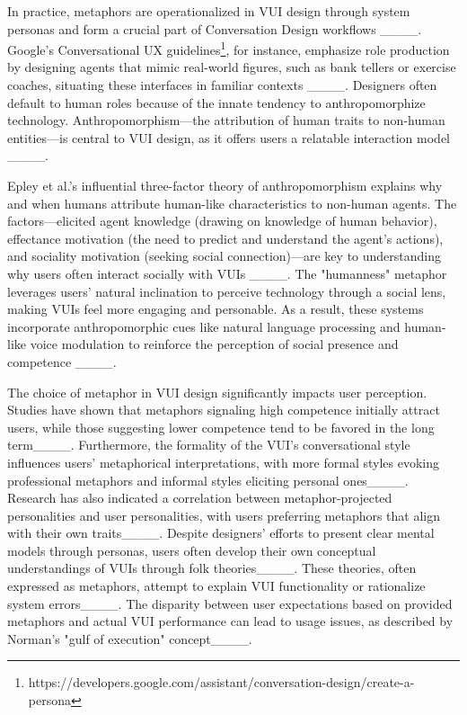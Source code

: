 In practice, metaphors are operationalized in VUI design through system personas and form a crucial part of Conversation Design workflows ____. Google's Conversational UX guidelines\footnote{https://developers.google.com/assistant/conversation-design/create-a-persona}, for instance, emphasize role production by designing agents that mimic real-world figures, such as bank tellers or exercise coaches, situating these interfaces in familiar contexts ____. Designers often default to human roles because of the innate tendency to anthropomorphize technology. Anthropomorphism—the attribution of human traits to non-human entities—is central to VUI design, as it offers users a relatable interaction model ____.

Epley et al.'s influential three-factor theory of anthropomorphism explains why and when humans attribute human-like characteristics to non-human agents. The factors—elicited agent knowledge (drawing on knowledge of human behavior), effectance motivation (the need to predict and understand the agent’s actions), and sociality motivation (seeking social connection)—are key to understanding why users often interact socially with VUIs ____. The "humanness" metaphor leverages users' natural inclination to perceive technology through a social lens, making VUIs feel more engaging and personable. As a result, these systems incorporate anthropomorphic cues like natural language processing and human-like voice modulation to reinforce the perception of social presence and competence ____. 


The choice of metaphor in VUI design significantly impacts user perception. Studies have shown that metaphors signaling high competence initially attract users, while those suggesting lower competence tend to be favored in the long term____. Furthermore, the formality of the VUI's conversational style influences users' metaphorical interpretations, with more formal styles evoking professional metaphors and informal styles eliciting personal ones____. Research has also indicated a correlation between metaphor-projected personalities and user personalities, with users preferring metaphors that align with their own traits____. Despite designers' efforts to present clear mental models through personas, users often develop their own conceptual understandings of VUIs through folk theories____. These theories, often expressed as metaphors, attempt to explain VUI functionality or rationalize system errors____. The disparity between user expectations based on provided metaphors and actual VUI performance can lead to usage issues, as described by Norman's "gulf of execution" concept____.


